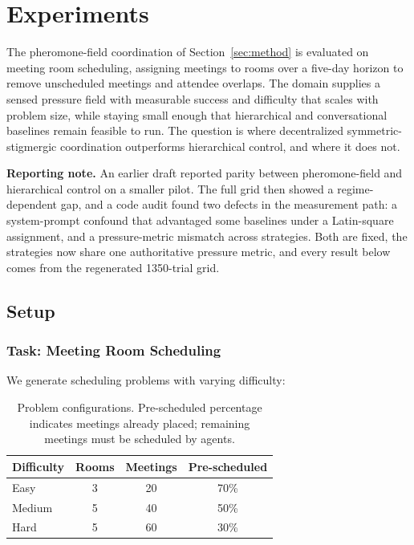 
\section{Experiments}
\label{sec:experiments}

The pheromone-field coordination of Section~\ref{sec:method} is evaluated on meeting room scheduling, assigning meetings to rooms over a five-day horizon to remove unscheduled meetings and attendee overlaps. The domain supplies a sensed pressure field with measurable success and difficulty that scales with problem size, while staying small enough that hierarchical and conversational baselines remain feasible to run. The question is where decentralized symmetric-stigmergic coordination outperforms hierarchical control, and where it does not.

\textbf{Reporting note.} An earlier draft reported parity between pheromone-field and hierarchical control on a smaller pilot. The full grid then showed a regime-dependent gap, and a code audit found two defects in the measurement path: a system-prompt confound that advantaged some baselines under a Latin-square assignment, and a pressure-metric mismatch across strategies. Both are fixed, the strategies now share one authoritative pressure metric, and every result below comes from the regenerated 1350-trial grid.

\subsection{Setup}

\subsubsection{Task: Meeting Room Scheduling}

We generate scheduling problems with varying difficulty:

\begin{table}[htbp]
\centering
\small
\begin{tabular}{@{}lccc@{}}
\toprule
\textbf{Difficulty} & \textbf{Rooms} & \textbf{Meetings} & \textbf{Pre-scheduled} \\
\midrule
Easy & 3 & 20 & 70\% \\
Medium & 5 & 40 & 50\% \\
Hard & 5 & 60 & 30\% \\
\bottomrule
\end{tabular}
\caption{Problem configurations. Pre-scheduled percentage indicates meetings already placed; remaining meetings must be scheduled by agents.}
\label{tab:problems}
\end{table}


